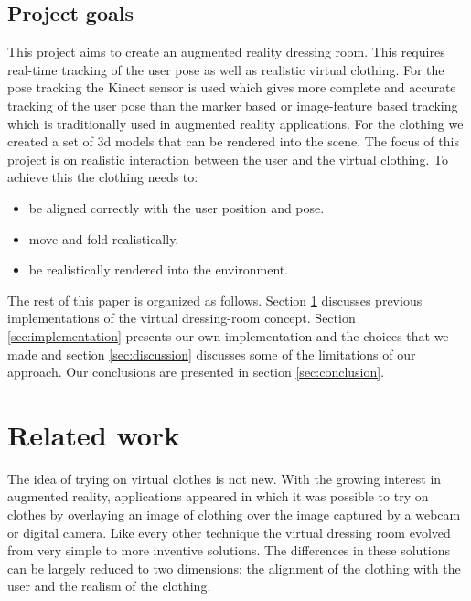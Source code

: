 \documentclass[twocolumn,a4paper]{article}
\begin{document}

\subsection{Project goals}
\label{sec:project_goals}

This project aims to create an augmented reality dressing room. This requires real-time tracking of the user pose as well as realistic virtual clothing. For the pose tracking the Kinect sensor is used which gives more complete and accurate tracking of the user pose than the marker based or image-feature based tracking which is traditionally used in augmented reality applications. For the clothing we created a set of 3d models that can be rendered into the scene. The focus of this project is on realistic interaction between the user and the virtual clothing. To achieve this the clothing needs to:
\begin{itemize}
\setlength{\itemsep}{0pt}
  \setlength{\parskip}{0pt}
  \setlength{\parsep}{0pt}
\item be aligned correctly with the user position and pose.
\item move and fold realistically. 
\item be realistically rendered into the environment.
\end{itemize}

The rest of this paper is organized as follows. Section \ref{sec:related_work} discusses previous implementations of the virtual dressing-room concept. Section \ref{sec:implementation} presents our own implementation and the choices that we made and section \ref{sec:discussion} discusses some of the limitations of our approach. Our conclusions are presented in section \ref{sec:conclusion}.


\section{Related work}
\label{sec:related_work}

The idea of trying on virtual clothes is not new. With the growing interest in augmented reality, applications appeared in which it was possible to try on clothes by overlaying an image of clothing over the image captured by a webcam or digital camera. Like every other technique the virtual dressing room evolved from very simple to more inventive solutions. The differences in these solutions can be largely reduced to two dimensions: the alignment of the clothing with the user and the realism of the clothing.
\end{document}
